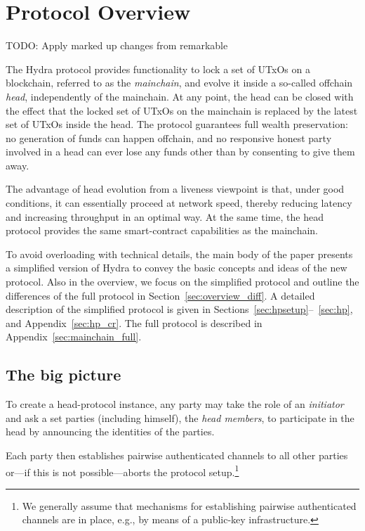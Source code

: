 \section{Protocol Overview}
\label{sec:overview}

TODO: Apply marked up changes from remarkable

The Hydra protocol provides functionality to lock a set of UTxOs on a
blockchain, referred to as the \emph{mainchain}, and evolve it inside a so-called offchain \emph{head}, independently of the
mainchain.  At any point, the head can be closed with the effect that the
locked set of UTxOs on the mainchain is replaced by the latest set of UTxOs
inside the head.
The protocol guarantees full wealth preservation: no generation
of funds can happen offchain, %
and no responsive
honest party involved in a head can ever lose any funds other than by
consenting to give them away.

The advantage of head evolution from a liveness viewpoint is that,
under good conditions, it can essentially proceed at network speed,
thereby reducing latency and increasing throughput in an optimal
way.  At the same time, the head protocol provides the same smart-contract
capabilities as the mainchain.

To avoid overloading with technical details, the main body of the paper presents a simplified
version of Hydra to convey the basic concepts and ideas
of the new protocol. Also in the overview, we focus on the simplified protocol
and outline the differences of the full protocol
in Section~\ref{sec:overview_diff}.
A detailed description of the simplified protocol is given in
Sections~\ref{sec:hpsetup}--~\ref{sec:hp},
and Appendix~\ref{sec:hp_cr}. The full protocol is described in
Appendix~\ref{sec:mainchain_full}.


\subsection{The big picture}
\label{sec:overview_bp}

To create a head-protocol instance, any party may take the role of an
\emph{initiator} and ask a set parties (including himself),
the \emph{head members}, to participate in the head by announcing the
identities of the parties.

Each party then establishes pairwise authenticated
channels to all other parties or---if this is not possible---aborts the protocol setup.\footnote{We generally assume that
  mechanisms for establishing pairwise
  authenticated channels are in place, e.g., by
  means of a public-key infrastructure.}

